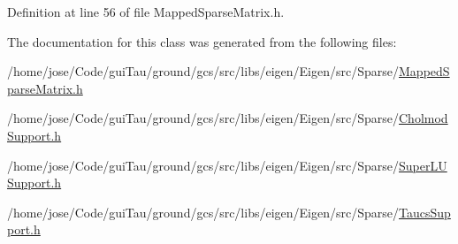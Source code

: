 Definition at line 56 of file Mapped\-Sparse\-Matrix.\-h.



The documentation for this class was generated from the following files\-:\begin{DoxyCompactItemize}
\item 
/home/jose/\-Code/gui\-Tau/ground/gcs/src/libs/eigen/\-Eigen/src/\-Sparse/\hyperlink{_mapped_sparse_matrix_8h}{Mapped\-Sparse\-Matrix.\-h}\item 
/home/jose/\-Code/gui\-Tau/ground/gcs/src/libs/eigen/\-Eigen/src/\-Sparse/\hyperlink{_cholmod_support_8h}{Cholmod\-Support.\-h}\item 
/home/jose/\-Code/gui\-Tau/ground/gcs/src/libs/eigen/\-Eigen/src/\-Sparse/\hyperlink{_super_l_u_support_8h}{Super\-L\-U\-Support.\-h}\item 
/home/jose/\-Code/gui\-Tau/ground/gcs/src/libs/eigen/\-Eigen/src/\-Sparse/\hyperlink{_taucs_support_8h}{Taucs\-Support.\-h}\end{DoxyCompactItemize}
